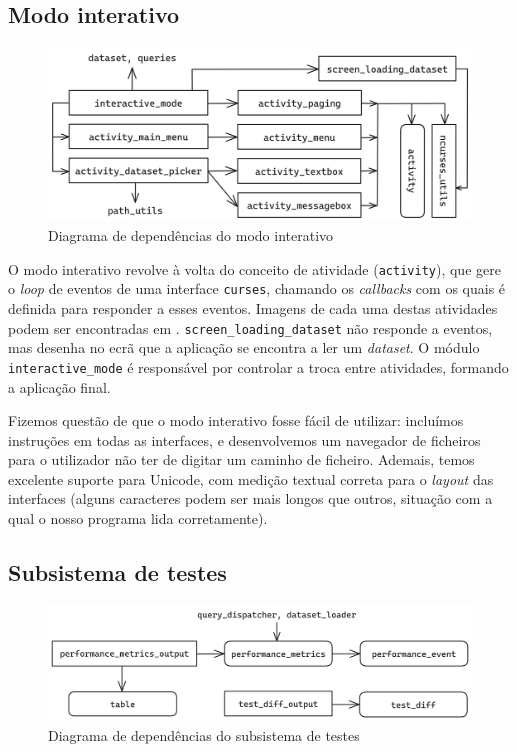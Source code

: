 \documentclass[12pt, a4paper]{article}
\begin{document}
\subsection{Modo interativo}
\label{sec:interactive-mode}

\begin{figure}[ht]
    \centering
    \includegraphics[scale=0.17]{res-fase2/interactive.png}
    \caption{Diagrama de dependências do modo interativo}
    \label{fig:interactive}
\end{figure}

O modo interativo revolve à volta do conceito de atividade (\texttt{activity}), que gere o
\emph{loop} de eventos de uma interface \texttt{curses}, chamando os \emph{callbacks} com os quais
é definida para responder a esses eventos. Imagens de cada uma destas atividades podem ser
encontradas em . \texttt{screen\_loading\_dataset} não responde
a eventos, mas desenha no ecrã que a aplicação se encontra a ler um \emph{dataset}. O módulo
\texttt{interactive\_mode} é responsável por controlar a troca entre atividades, formando a
aplicação final.

Fizemos questão de que o modo interativo fosse fácil de utilizar: incluímos instruções em todas as
interfaces, e desenvolvemos um navegador de ficheiros para o utilizador não ter de digitar um
caminho de ficheiro. Ademais, temos excelente suporte para Unicode, com medição textual correta para
o \emph{layout} das interfaces (alguns caracteres podem ser mais longos que outros, situação
com a qual o nosso programa lida corretamente).

\subsection{Subsistema de testes}
\label{sec:testing-subsystem}

\begin{figure}[ht]
    \centering
    \includegraphics[scale=0.15]{res-fase2/testing.png}
    \caption{Diagrama de dependências do subsistema de testes}
    \label{fig:testing}
\end{figure}
\end{document}
